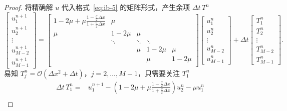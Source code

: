 \begin{proof}
    将精确解 $u$ 代入格式~\eqref{eq:ib-5} 的矩阵形式，产生余项 $\Delta t \,T^n$
    \[
        \begin{bmatrix}
            u_1^{n+1} \\ u_2^{n+1} \\ \vdots \\ u_{M-2}^{n+1} \\ u_{M-1}^{n+1}
        \end{bmatrix}
        =
        \begin{bmatrix}
            1-2\mu + \mu\frac{1-\frac{\sigma}2 \Delta x}{1 + \frac{\sigma}2 \Delta x} & \mu    &        &        &        \\
            \mu                                                                       & 1-2\mu & \mu    &        &        \\
                                                                                      & \ddots & \ddots & \ddots &        \\
                                                                                      &        & \mu    & 1-2\mu & \mu    \\
                                                                                      &        &        & \mu    & 1-2\mu \\
        \end{bmatrix}
        \begin{bmatrix}
            u_1^{n} \\ u_2^{n} \\ \vdots \\ u_{M-2}^{n} \\ u_{M-1}^{n}
        \end{bmatrix}
        +
        \Delta t
        \begin{bmatrix}
            T_1^{n} \\ T_2^{n} \\ \vdots \\ T_{M-2}^{n} \\ T_{M-1}^{n}
        \end{bmatrix}.
    \]
    易知 $T_j^{n} = \mathcal{O}(\Delta x^2 + \Delta t)$，$j=2,\dots,M-1$，只需要关注 $T_1^{n}$
    \begin{align*}
        \Delta t\, T_1^{n} ={} & u_1^{n+1} - \left(1-2\mu + \mu \frac{1-\frac{\sigma}2 \Delta x}{1 + \frac{\sigma}2 \Delta x}\right) u_2^n
        - \mu u_1^n                                                                                                                        \\

\end{align*}
\end{proof}
